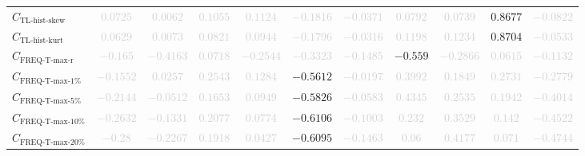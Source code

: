 \documentclass{standalone}
\newcommand{\tlskewhistname}{\text{TL-hist-skew}}
\newcommand{\tlskewhist}{C_{\tlskewhistname}}
\newcommand{\tlkurthistname}{\text{TL-hist-kurt}}
\newcommand{\tlkurthist}{C_{\tlkurthistname}}
\newcommand{\freqmaxrname}{\text{FREQ-T-max-r}}
\newcommand{\freqmaxr}{C_{\freqmaxrname}}
\newcommand{\freqmaxonename}{\text{FREQ-T-max-1\%}}
\newcommand{\freqmaxone}{C_{\freqmaxonename}}
\newcommand{\freqmaxfivename}{\text{FREQ-T-max-5\%}}
\newcommand{\freqmaxfive}{C_{\freqmaxfivename}}
\newcommand{\freqmaxtenname}{\text{FREQ-T-max-10\%}}
\newcommand{\freqmaxten}{C_{\freqmaxtenname}}
\newcommand{\freqmaxtwentyname}{\text{FREQ-T-max-20\%}}
\newcommand{\freqmaxtwenty}{C_{\freqmaxtwentyname}}
\begin{document}
\begin{tabular}{lcccccccccc}
$\tlskewhist$ & \textcolor{lightgray}{$0.0725$} & \textcolor{lightgray}{$0.0062$} & \textcolor{lightgray}{$0.1055$} & \textcolor{lightgray}{$0.1124$} & \textcolor{lightgray}{$-0.1816$} & \textcolor{lightgray}{$-0.0371$} & \textcolor{lightgray}{$0.0792$} & \textcolor{lightgray}{$0.0739$} & $0.8677$ & \textcolor{lightgray}{$-0.0822$} \\ 
$\tlkurthist$ & \textcolor{lightgray}{$0.0629$} & \textcolor{lightgray}{$0.0073$} & \textcolor{lightgray}{$0.0821$} & \textcolor{lightgray}{$0.0944$} & \textcolor{lightgray}{$-0.1796$} & \textcolor{lightgray}{$-0.0316$} & \textcolor{lightgray}{$0.1198$} & \textcolor{lightgray}{$0.1234$} & $0.8704$ & \textcolor{lightgray}{$-0.0533$} \\ 
$\freqmaxr$ & \textcolor{lightgray}{$-0.165$} & \textcolor{lightgray}{$-0.4163$} & \textcolor{lightgray}{$0.0718$} & \textcolor{lightgray}{$-0.2544$} & \textcolor{lightgray}{$-0.3323$} & \textcolor{lightgray}{$-0.1485$} & $-0.559$ & \textcolor{lightgray}{$-0.2866$} & \textcolor{lightgray}{$0.0615$} & \textcolor{lightgray}{$-0.1132$} \\ 
$\freqmaxone$ & \textcolor{lightgray}{$-0.1552$} & \textcolor{lightgray}{$0.0257$} & \textcolor{lightgray}{$0.2543$} & \textcolor{lightgray}{$0.1284$} & $-0.5612$ & \textcolor{lightgray}{$-0.0197$} & \textcolor{lightgray}{$0.3992$} & \textcolor{lightgray}{$0.1849$} & \textcolor{lightgray}{$0.2731$} & \textcolor{lightgray}{$-0.2779$} \\ 
$\freqmaxfive$ & \textcolor{lightgray}{$-0.2144$} & \textcolor{lightgray}{$-0.0512$} & \textcolor{lightgray}{$0.1653$} & \textcolor{lightgray}{$0.0949$} & $-0.5826$ & \textcolor{lightgray}{$-0.0583$} & \textcolor{lightgray}{$0.4345$} & \textcolor{lightgray}{$0.2535$} & \textcolor{lightgray}{$0.1942$} & \textcolor{lightgray}{$-0.4014$} \\ 
$\freqmaxten$ & \textcolor{lightgray}{$-0.2632$} & \textcolor{lightgray}{$-0.1331$} & \textcolor{lightgray}{$0.2077$} & \textcolor{lightgray}{$0.0774$} & $-0.6106$ & \textcolor{lightgray}{$-0.1003$} & \textcolor{lightgray}{$0.232$} & \textcolor{lightgray}{$0.3529$} & \textcolor{lightgray}{$0.142$} & \textcolor{lightgray}{$-0.4522$} \\ 
$\freqmaxtwenty$ & \textcolor{lightgray}{$-0.28$} & \textcolor{lightgray}{$-0.2267$} & \textcolor{lightgray}{$0.1918$} & \textcolor{lightgray}{$0.0427$} & $-0.6095$ & \textcolor{lightgray}{$-0.1463$} & \textcolor{lightgray}{$0.06$} & \textcolor{lightgray}{$0.4177$} & \textcolor{lightgray}{$0.071$} & \textcolor{lightgray}{$-0.4744$} \\ 

\end{tabular}
\end{document}
